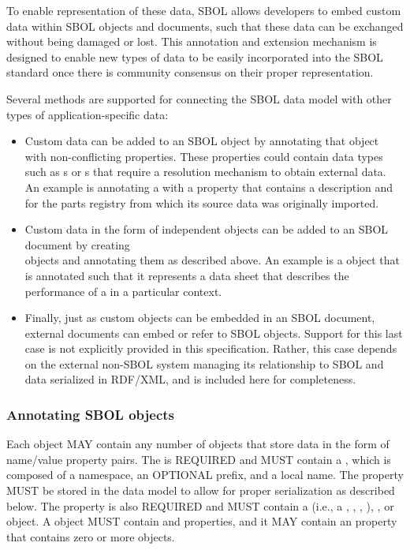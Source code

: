 To enable representation of these data, SBOL allows developers to embed custom data within SBOL objects and documents, such that these data can be exchanged without being damaged or lost. This annotation and extension mechanism is designed to enable new types of data to be easily incorporated into the SBOL standard once there is community consensus on their proper representation.

Several methods are supported for connecting the SBOL data model with other types of application-specific data:
\begin{itemize}
\item Custom data can be added to an SBOL object by annotating that object with non-conflicting properties. These properties could contain  data types such as s or s that require a resolution mechanism to obtain external data. An example is annotating a  with  a property that contains a  description and  for the parts registry from which its source data was originally imported.
\item Custom data in the form of independent objects can be added to an SBOL document by  creating\\
 objects and annotating them as described above. An example is a  object that is annotated such that it represents a data sheet that describes the performance of a  in a particular context.
\item Finally, just as custom objects can be embedded in an  SBOL document, external documents can embed or refer to SBOL objects. Support for this last case is not explicitly provided in this specification. Rather, this case depends on the external non-SBOL system managing its relationship to SBOL and data serialized in RDF/XML, and is included here for completeness.
\end{itemize}

\subsubsection{Annotating SBOL objects}
\label{sec:qName}
\label{sec:QName}
\label{sec:value}
\label{sec:Annotation}
\label{sec:AnnotationValue}
\label{sec:NestedAnnotations}
\label{sec:nestedQName}
\label{sec:nestedURI}

Each  object MAY contain any number of  objects that store data in the form of name/value property pairs. The  is REQUIRED and MUST contain a , which is composed of a namespace, an OPTIONAL prefix, and a local name. The  property MUST be stored in the data model to allow for proper serialization as described below.
The  property is also REQUIRED and MUST contain a  (i.e., a , , , ), , or  object. A  object MUST contain  and  properties, and it MAY contain an  property that contains zero or more  objects.

